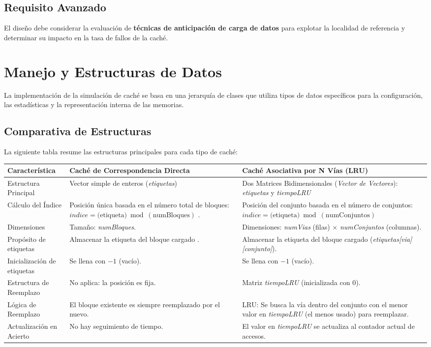 \documentclass{article}
\begin{document}
\subsection{Requisito Avanzado}
El diseño debe considerar la evaluación de \textbf{técnicas de anticipación de carga de datos} para explotar la localidad de referencia y determinar su impacto en la tasa de fallos de la caché.

\section{Manejo y Estructuras de Datos}
La implementación de la simulación de caché se basa en una jerarquía de clases que utiliza tipos de datos específicos para la configuración, las estadísticas y la representación interna de las memorias.

\subsection{Comparativa de Estructuras}
La siguiente tabla resume las estructuras principales para cada tipo de caché:
\begin{longtable}{|p{3.5cm}|p{6cm}|p{6cm}|}
\hline
\textbf{Característica} & \textbf{Caché de Correspondencia Directa} & \textbf{Caché Asociativa por N Vías (LRU)} \\
\hline
\endhead
Estructura Principal & Vector simple de enteros (\textit{etiquetas}) & Dos Matrices Bidimensionales (\textit{Vector de Vectores}): \textit{etiquetas} y \textit{tiempoLRU} \\
\hline
Cálculo del Índice & Posición única basada en el número total de bloques: $indice = \text{(etiqueta)} \bmod (\text{numBloques})$ . & Posición del conjunto basada en el número de conjuntos: $indice = \text{(etiqueta)} \bmod (\text{numConjuntos})$  \\
\hline
Dimensiones & Tamaño: \textit{numBloques}. & Dimensiones: \textit{numVias} (filas) $\times$ \textit{numConjuntos} (columnas). \\
\hline
Propósito de etiquetas & Almacenar la etiqueta del bloque cargado . & Almacenar la etiqueta del bloque cargado (\textit{etiquetas[via][conjunto]}). \\
\hline
Inicialización de etiquetas & Se llena con $-1$ (vacío). & Se llena con $-1$ (vacío). \\
\hline
Estructura de Reemplazo & No aplica: la posición es fija. & Matriz \textit{tiempoLRU} (inicializada con 0). \\
\hline
Lógica de Reemplazo & El bloque existente es siempre reemplazado por el nuevo. & LRU: Se busca la vía dentro del conjunto con el menor valor en \textit{tiempoLRU} (el menos usado) para reemplazar. \\
\hline
Actualización en Acierto & No hay seguimiento de tiempo. & El valor en \textit{tiempoLRU} se actualiza al contador actual de accesos. \\
\hline
\end{longtable}
\end{document}

